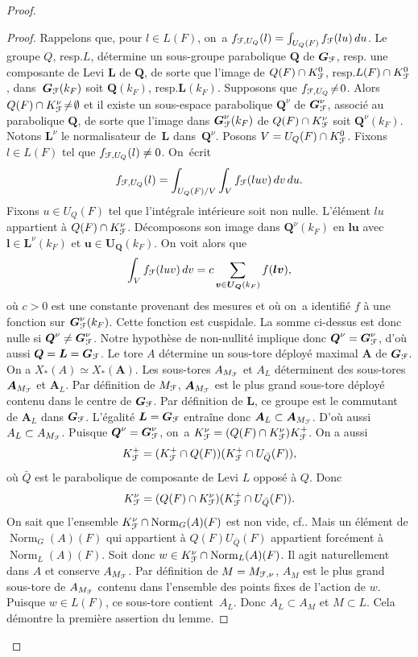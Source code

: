 \documentclass[11pt]{article}
\newcommand{\cf}{cf.\xspace}
\newcommand{\resp}{resp.\xspace}
\numberwithin{equation}{section}\providecommand{\og}{«\,}\providecommand{\fg}{\,»}
\let\mathcal \EuScript
\DeclareMathOperator{\Norm}{Norm}
\newcommand{\bmu}{\boldsymbol{u}}
\newcommand{\bmv}{\boldsymbol{v}}
\newcommand{\bA}{\boldsymbol{A}}
\newcommand{\bG}{\boldsymbol{G}}
\newcommand{\bl}{\boldsymbol{l}}
\newcommand{\bL}{\boldsymbol{L}}
\newcommand{\bQ}{\boldsymbol{Q}}
\newcommand{\bU}{\boldsymbol{U}}
\newcommand{\cF}{\mathcal{F}}
\theoremstyle{plain}
\theoremstyle{definition}
\begin{document}
\begin{proof}
\begin{proof}
Rappelons que, pour $l\in L(F)$, on~a $f_{\cF,U_{Q}}(l)=\int_{U_{Q}(F)}f_{\cF}(lu)\,du$. Le groupe $Q$, \resp $L$, détermine un sous-groupe parabolique $\bQ$ de $\bG_{\cF}$, \resp une composante de Levi $\bL$ de $\bQ$, de sorte que l'image de $Q(F)\cap K_{\cF}^0$, \resp $L(F)\cap K_{\cF}^0$, dans~$\bG_{\cF}(k_{F})$ soit $\bQ(k_{F})$, \resp $\bL(k_{F})$. Supposons que $f_{\cF,U_{Q}}\!\neq\!0$. Alors $Q(F)\cap K_{\cF}^{\nu}\!\neq\!\emptyset$ et il existe un sous-espace parabolique $\bQ^{\nu}$ de $\bG^{\nu}_{\cF}$, associé au parabolique $\bQ$, de sorte que l'image dans $\bG^{\nu}_{\cF}(k_{F})$ de $Q(F)\cap K_{\cF}^{\nu}$ soit $\bQ^{\nu}(k_{F})$. Notons $\bL^{\nu}$ le normalisateur de~$\bL$ dans~$\bQ^{\nu}$. Posons $V=U_{Q}(F)\cap K_{\cF}^0$. Fixons $l\in L(F)$ tel que $f_{\cF,U_{Q}}(l)\neq0$. On~écrit
\[
f_{\cF,U_{Q}}(l)=\int_{U_{Q}(F)/V}\int_{V}f_{\cF}(luv)\,dv\,du.
\]
Fixons $u\in U_{Q}(F)$ tel que l'intégrale intérieure soit non nulle. L'élément $lu$ appartient à $Q(F)\cap K_{\cF}^{\nu}$. Décomposons son image dans $\bQ^{\nu}(k_{F})$ en $\bl\bmu$ avec $\bl\in \bL^{\nu}(k_{F})$ et $\bmu\in \bU_{\bQ}(k_{F})$. On voit alors que
\[
\int_{V}f_{\cF}(luv)\,dv=c\sum_{\bmv\in \bU_{\bQ}(k_{F})}f(\bl\bmv),
\]
où $c>0$ est une constante provenant des mesures et où on~a identifié $f$ à une fonction sur $\bG^{\nu}_{\cF}(k_{F})$. Cette fonction est cuspidale. La somme ci-dessus est donc nulle si $\bQ^{\nu}\neq\bG_{\cF}^{\nu}$. Notre hypothèse de non-nullité implique donc $\bQ^{\nu}=\bG_{\cF}^{\nu}$, d'où aussi $\bQ=\bL=\bG_{\cF}$. Le tore $A$ détermine un sous-tore déployé maximal $\bA$ de $\bG_{\cF}$. On a $X_{*}(A)\simeq X_{*}(\bA)$. Les sous-tores $A_{M_{\cF}}$ et $A_{L}$ déterminent des sous-tores $\bA_{M_{\cF}}$ et $\bA_{L}$. Par définition de $M_{\cF}$, $\bA_{M_{\cF}}$ est le plus grand sous-tore déployé contenu dans le centre de $\bG_{\cF}$. Par définition de $\bL$, ce groupe est le commutant de $\bA_{L}$ dans $\bG_{\cF}$. L'égalité $\bL=\bG_{\cF}$ entraîne donc $\bA_{L}\subset \bA_{M_\cF}$. D'où aussi $A_{L}\subset A_{M_{\cF}}$. Puisque $\bQ^{\nu}=\bG_{\cF}^{\nu}$, on~a $K_{\cF}^{\nu}=(Q(F)\cap K_{\cF}^{\nu})K_{\cF}^+$. On a aussi
\[
K_{\cF}^+=(K_{\cF}^+\cap Q(F))(K_{\cF}^+\cap U_{\bar{Q}}(F)),
\]
où $\bar{Q}$ est le parabolique de composante de Levi $L$ opposé à $Q$. Donc
\[
K_{\cF}^{\nu}=(Q(F)\cap K_{\cF}^{\nu})(K_{\cF}^+\cap U_{\bar{Q}}(F)).
\]
On sait que l'ensemble $K_{\cF}^{\nu}\cap \Norm_{G}(A)(F)$ est non vide, \cf \cite[7.4.4]{BT}. Mais un élément de $\Norm_{G}(A)(F)$ qui appartient à $Q(F)U_{\bar{Q}}(F)$ appartient forcément à $\Norm_{L}(A)(F)$. Soit donc $w\in K_{\cF}^{\nu}\cap \Norm_{L}(A)(F)$. Il agit naturellement dans $A$ et conserve $A_{M_{\cF}}$. Par définition de $M=M_{\cF,\nu}$, $A_{M}$ est le plus grand sous-tore de $A_{M_{\cF}}$ contenu dans l'ensemble des points fixes de l'action de $w$. Puisque $w\in L(F)$, ce sous-tore contient~$A_{L}$. Donc $A_{L}\subset A_{M}$ et $M\subset L$. Cela démontre la première assertion du lemme.


\end{proof}
\end{proof}
\end{document}
